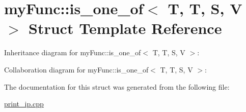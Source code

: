 \hypertarget{structmyFunc_1_1is__one__of_3_01T_00_01T_00_01S_00_01V_01_4}{}\section{my\+Func\+:\+:is\+\_\+one\+\_\+of$<$ T, T, S, V $>$ Struct Template Reference}
\label{structmyFunc_1_1is__one__of_3_01T_00_01T_00_01S_00_01V_01_4}


Inheritance diagram for my\+Func\+:\+:is\+\_\+one\+\_\+of$<$ T, T, S, V $>$\+:


Collaboration diagram for my\+Func\+:\+:is\+\_\+one\+\_\+of$<$ T, T, S, V $>$\+:


The documentation for this struct was generated from the following file\+:\begin{DoxyCompactItemize}
\item 
\hyperlink{print__ip_8cpp}{print\+\_\+ip.\+cpp}\end{DoxyCompactItemize}
